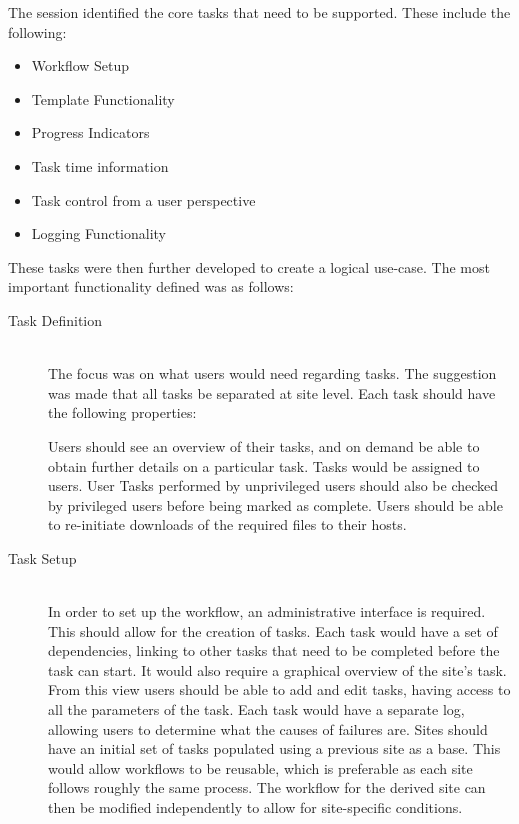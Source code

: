 The session identified the core tasks that need to be supported. These
include the following:
\begin{itemize}
    \item Workflow Setup
    \item Template Functionality
    \item Progress Indicators
    \item Task time information
    \item Task control from a user perspective
    \item Logging Functionality
\end{itemize}
These tasks were then further developed to create a logical use-case. The
most important functionality defined was as follows:
\begin{description}
    \item[Task Definition] \hfill \\
        The focus was on what users would need regarding tasks.
        The suggestion was made that all tasks be separated at site level.
        Each task should have the following properties:
        Users should see an overview of their tasks, and on demand be able to
	obtain
        further details on a particular task. Tasks would be assigned to users.
        User Tasks performed by unprivileged users should also be checked by
        privileged users before being marked as complete. Users should be
        able to re-initiate downloads of the required files to their hosts.

    \item[Task Setup] \hfill \\
        In order to set up the workflow, an administrative interface is required.
        This should allow for the creation of tasks. Each task would have a set
        of dependencies, linking to other tasks that need to be completed before
        the task can start. It would also require a graphical overview of the
        site's task. From this view users should be able to add and edit tasks,
        having access to all the parameters of the task. Each task would have
        a separate log, allowing users to determine what the causes of failures are.
	Sites should have an initial set of tasks populated using a
	previous site as a base. This would allow workflows to be reusable, which
        is preferable as each site follows roughly the same process. The
	workflow for the derived site can then be modified independently to
	allow for site-specific conditions.
\end{description}
